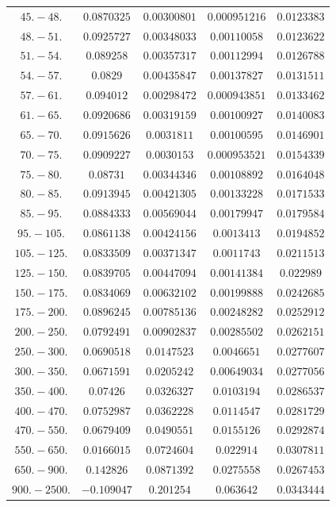 \documentclass[11pt]{article}
\begin{document}
\begin{table}[htbp]
{\begin{tabular}{ccccc}
        $45.-48.$ & $0.0870325$ & $0.00300801$ & $0.000951216$ & $0.0123383$ \\
        $48.-51.$ & $0.0925727$ & $0.00348033$ & $0.00110058$ & $0.0123622$ \\
        $51.-54.$ & $0.089258$ & $0.00357317$ & $0.00112994$ & $0.0126788$ \\
        $54.-57.$ & $0.0829$ & $0.00435847$ & $0.00137827$ & $0.0131511$ \\
        $57.-61.$ & $0.094012$ & $0.00298472$ & $0.000943851$ & $0.0133462$ \\
        $61.-65.$ & $0.0920686$ & $0.00319159$ & $0.00100927$ & $0.0140083$ \\
        $65.-70.$ & $0.0915626$ & $0.0031811$ & $0.00100595$ & $0.0146901$ \\
        $70.-75.$ & $0.0909227$ & $0.0030153$ & $0.000953521$ & $0.0154339$ \\
        $75.-80.$ & $0.08731$ & $0.00344346$ & $0.00108892$ & $0.0164048$ \\
        $80.-85.$ & $0.0913945$ & $0.00421305$ & $0.00133228$ & $0.0171533$ \\
        $85.-95.$ & $0.0884333$ & $0.00569044$ & $0.00179947$ & $0.0179584$ \\
        $95.-105.$ & $0.0861138$ & $0.00424156$ & $0.0013413$ & $0.0194852$ \\
        $105.-125.$ & $0.0833509$ & $0.00371347$ & $0.0011743$ & $0.0211513$ \\
        $125.-150.$ & $0.0839705$ & $0.00447094$ & $0.00141384$ & $0.022989$ \\
        $150.-175.$ & $0.0834069$ & $0.00632102$ & $0.00199888$ & $0.0242685$ \\
        $175.-200.$ & $0.0896245$ & $0.00785136$ & $0.00248282$ & $0.0252912$ \\
        $200.-250.$ & $0.0792491$ & $0.00902837$ & $0.00285502$ & $0.0262151$ \\
        $250.-300.$ & $0.0690518$ & $0.0147523$ & $0.0046651$ & $0.0277607$ \\
        $300.-350.$ & $0.0671591$ & $0.0205242$ & $0.00649034$ & $0.0277056$ \\
        $350.-400.$ & $0.07426$ & $0.0326327$ & $0.0103194$ & $0.0286537$ \\
        $400.-470.$ & $0.0752987$ & $0.0362228$ & $0.0114547$ & $0.0281729$ \\
        $470.-550.$ & $0.0679409$ & $0.0490551$ & $0.0155126$ & $0.0292874$ \\
        $550.-650.$ & $0.0166015$ & $0.0724604$ & $0.022914$ & $0.0307811$ \\
        $650.-900.$ & $0.142826$ & $0.0871392$ & $0.0275558$ & $0.0267453$ \\
        $900.-2500.$ & $-0.109047$ & $0.201254$ & $0.063642$ & $0.0343444$ \\
	\bottomrule
	\end{tabular}
}
\end{table}
\end{document}
